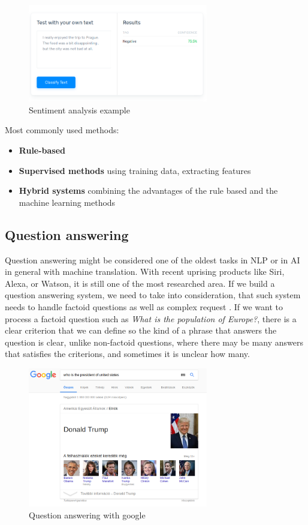\begin{figure}[h]
	\centering
	\includegraphics[width=0.7\textwidth]{figures/sentiment}
	\caption{Sentiment analysis example}
	\label{fig:sen}
\end{figure}
Most commonly used methods:
\begin{itemize}
	\item \textbf{Rule-based}
	\item \textbf{Supervised methods} using training data, extracting features
	\item \textbf{Hybrid systems} combining the advantages of the rule based and the machine learning methods
\end{itemize}

\subsection{Question answering}
Question answering might be considered one of the oldest tasks in NLP or in AI in general with machine translation. With recent uprising products like Siri, Alexa, or Watson, it is still one of the most researched area.
If we build a question answering system, we need to take into consideration, that such system needs to handle factoid questions as well as complex request \cite{Ralph:2017}. If we want to process a factoid question such as \textit{What is the population of Europe?}, there is a clear criterion that we can define so the kind of a phrase that answers the question is clear, unlike non-factoid questions, where there may be many answers that satisfies the criterions, and sometimes it is unclear how many.

\begin{figure}[h]
	\centering
	\includegraphics[width=0.7\textwidth]{figures/qagoogle}
	\caption{Question answering with google}
	\label{fig:qa}
\end{figure}

